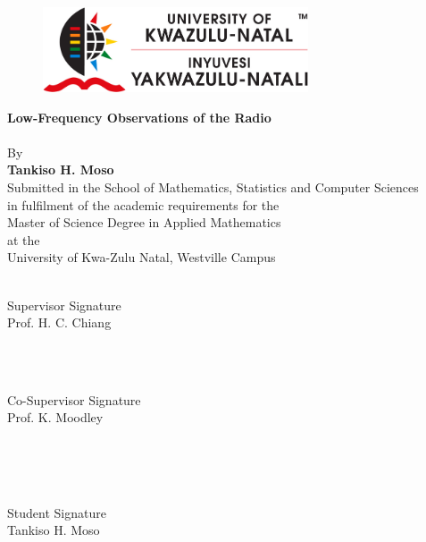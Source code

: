 \documentclass[12pt,a4paper]{report}
\begin{document}
	\begin{titlepage}
		
		\newcommand{\HRule}{\rule{\linewidth}{0.5mm}} %
		
		\begin{center}
			\begin{figure}[ht]
				\centering
				\includegraphics[width=0.7\textwidth]{Figures/UKZNLOGO.png}\\[1cm]
			\end{figure}
			
			\LARGE {\textbf {Low-Frequency Observations of the Radio\\[0.3cm Sky from Marion Island]}}\\[1cm]
			{By}\\[0.5cm]
			\textbf {\Large {Tankiso H. Moso}}\\[0.5cm]
			{\small Submitted in the School of Mathematics, Statistics and Computer Sciences\\in  fulfilment of the academic requirements for the\\Master of Science Degree in Applied Mathematics\\at the\\University of Kwa-Zulu Natal, Westville Campus}\\[3cm]
			
			\begin{minipage}{0.45\textwidth}
				\begin{flushleft} \large
					\hrulefill\\
					Supervisor Signature \\
					Prof. H. C. Chiang %
				\end{flushleft}
			\end{minipage}
			~
			\begin{minipage}{0.45\textwidth}
				\begin{flushright} \large
					\hrulefill\\
					Co-Supervisor Signature \\
					Prof. K. Moodley %
				\end{flushright}
			\end{minipage}\\[3cm]
			~
			\begin{minipage}{0.5\textwidth}
				\begin{center} \large
					\hrulefill\\
					Student Signature\\
					Tankiso H. Moso %
				\end{center}
			\end{minipage}\\[2cm]
			

\end{center}
\end{titlepage}
\end{document}
